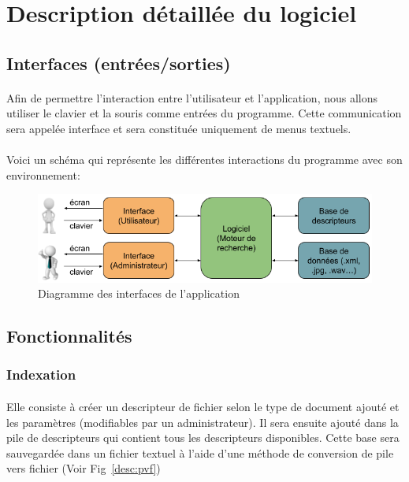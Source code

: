 \documentclass[../main.tex]{subfiles}
\begin{document}
    
    \section{Description détaillée du logiciel}
    \subsection{Interfaces (entrées/sorties)}
    \paragraph{}
    Afin de permettre l'interaction entre l’utilisateur et l’application, nous allons utiliser le clavier et la souris comme entrées du programme. Cette communication sera appelée interface et sera constituée uniquement de menus textuels.

    \paragraph{}
    Voici un schéma qui représente les différentes interactions du programme avec son environnement:

    \begin{figure}[H]
        \begin{center}
            \includegraphics[scale=0.6]{diagrams/entrees_sorties.png}
            \caption{Diagramme des interfaces de l'application}
        \end{center}
    \end{figure}

    \subsection{Fonctionnalités}
    \subsubsection{Indexation}
    \paragraph{}
    Elle consiste à créer un descripteur de fichier selon le type de document ajouté et les paramètres (modifiables par un administrateur). Il sera ensuite ajouté dans la pile de descripteurs qui contient tous les descripteurs disponibles. Cette base sera sauvegardée dans un fichier textuel à l'aide d'une méthode de conversion de pile vers fichier (Voir Fig~\ref{desc:pvf})
    
\end{document}
